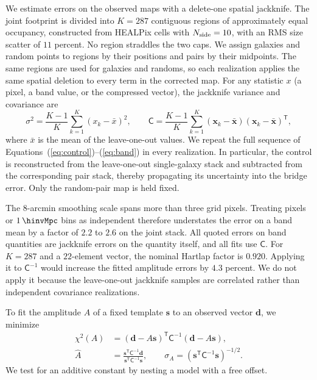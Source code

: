 We estimate errors on the observed maps with a delete-one spatial jackknife.
The joint footprint is divided into $K=287$ contiguous regions of
approximately equal occupancy, constructed from HEALPix cells with
$N_{\rm side}=10$, with an RMS size scatter of $11$ percent.
No region straddles the two caps. We assign galaxies and random points to
regions by their positions and pairs by their midpoints. The same regions are
used for galaxies and randoms, so each realization applies the same spatial
deletion to every term in the corrected map. For any statistic $x$ (a pixel,
a band value, or the compressed vector), the jackknife variance and
covariance are
\begin{equation}
  \sigma^{2}=\frac{K-1}{K}\sum_{k=1}^{K}(x_{k}-\bar x)^{2}, \qquad
  \mathsf{C}=\frac{K-1}{K}\sum_{k=1}^{K}(\mathbf{x}_{k}-\bar{\mathbf{x}})
                                          (\mathbf{x}_{k}-\bar{\mathbf{x}})^{\mathsf T},
  \label{eq:jackknife}
\end{equation}
where $\bar x$ is the mean of the leave-one-out values. We repeat the full
sequence of Equations~(\ref{eq:control})--(\ref{eq:band}) in every
realization. In particular, the control is reconstructed from the
leave-one-out single-galaxy stack and subtracted from the corresponding pair
stack, thereby propagating its uncertainty into the bridge error. Only the
random-pair map is held fixed.

The $8$-arcmin smoothing scale spans more than three grid pixels. Treating
pixels or $1\,\hinvMpc$ bins as independent therefore
understates the error on a band mean by a factor of $2.2$ to $2.6$ on the
joint stack. %
All quoted errors on band quantities are jackknife errors on the quantity
itself, and all fits use $\mathsf{C}$. For $K=287$ and a $22$-element vector,
the nominal Hartlap factor is $0.920$. Applying it to $\mathsf{C}^{-1}$ would
increase the fitted amplitude errors by $4.3$ percent. We do not apply it
because the leave-one-out jackknife samples are correlated rather than
independent covariance realizations.

To fit the amplitude $A$ of a fixed template $\mathbf{s}$ to an observed
vector $\mathbf{d}$, we minimize
\begin{equation}
  \begin{aligned}
  \chi^{2}(A) &=(\mathbf{d}-A\mathbf{s})^{\mathsf T}\mathsf{C}^{-1}
                 (\mathbf{d}-A\mathbf{s}), \\
  \hat A &=\frac{\mathbf{s}^{\mathsf T}\mathsf{C}^{-1}\mathbf{d}}
                 {\mathbf{s}^{\mathsf T}\mathsf{C}^{-1}\mathbf{s}}, \qquad
  \sigma_{A}=\left(\mathbf{s}^{\mathsf T}\mathsf{C}^{-1}\mathbf{s}\right)^{-1/2}.
  \end{aligned}
  \label{eq:amplitude}
\end{equation}
We test for an additive constant by nesting a model with a free offset.

